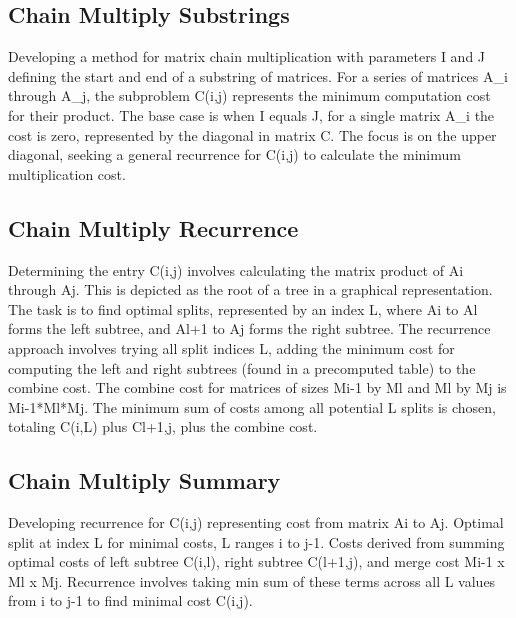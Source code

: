 \subsection*{Chain Multiply  Substrings}
Developing a method for matrix chain multiplication with parameters I and J defining the start and end of a substring of matrices.
For a series of matrices A\_i through A\_j, the subproblem C(i,j) represents the minimum computation cost for their product.
The base case is when I equals J, for a single matrix A\_i the cost is zero, represented by the diagonal in matrix C\@.
The focus is on the upper diagonal, seeking a general recurrence for C(i,j) to calculate the minimum multiplication cost.

\subsection*{Chain Multiply  Recurrence}
Determining the entry C(i,j) involves calculating the matrix product of Ai through Aj.
This is depicted as the root of a tree in a graphical representation.
The task is to find optimal splits, represented by an index L, where Ai to Al forms the left subtree, and Al+1 to Aj forms the right subtree.
The recurrence approach involves trying all split indices L, adding the minimum cost for computing the left and right subtrees (found in a precomputed table) to the combine cost.
The combine cost for matrices of sizes Mi-1 by Ml and Ml by Mj is Mi-1*Ml*Mj.
The minimum sum of costs among all potential L splits is chosen, totaling C(i,L) plus Cl+1,j, plus the combine cost.

\subsection*{Chain Multiply  Summary}
Developing recurrence for C(i,j) representing cost from matrix Ai to Aj.
Optimal split at index L for minimal costs, L ranges i to j-1.
Costs derived from summing optimal costs of left subtree C(i,l), right subtree C(l+1,j), and merge cost Mi-1 x Ml x Mj.
Recurrence involves taking min sum of these terms across all L values from i to j-1 to find minimal cost C(i,j).

